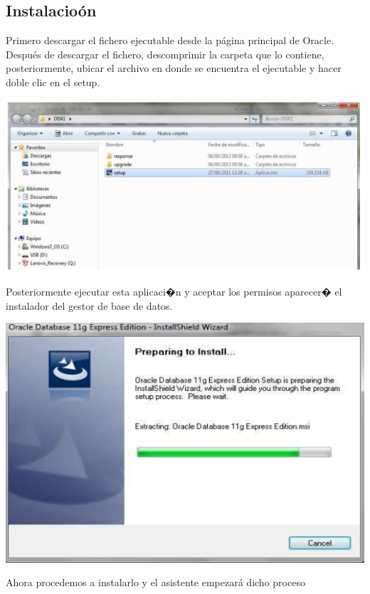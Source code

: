 \documentclass[12pt,letterpaper]{article}
\begin{document}
\subsection{Instalacio\'on}
Primero descargar el fichero ejecutable desde la p\'agina principal de Oracle.
Despu\'es de descargar el fichero, descomprimir la carpeta que lo contiene,
posteriormente, ubicar el archivo en donde se encuentra el ejecutable y
hacer doble clic en el setup.
\begin{center}
	\includegraphics[width=15cm]{./IMG/img1}
\end{center} 
Posteriormente ejecutar esta aplicaci�n y aceptar los permisos aparecer� el
instalador del gestor de base de datos.
\begin{center}
	\includegraphics[width=15cm]{./IMG/img2}
\end{center} 
\newpage
Ahora procedemos a instalarlo y el asistente empezar\'a dicho proceso
\end{document}

